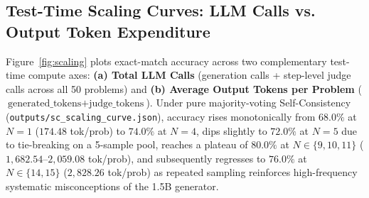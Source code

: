 \documentclass[10pt,a4paper]{article}
\begin{document}
\begin{table}[h!]
\centering
\caption{Empirical benchmark results across all 50 GSM8K test problems (\texttt{outputs/results\_summary.json} and \texttt{outputs/bonus\_product\_logprob.json}). Across 250 shared candidate paths, the 7B judge evaluated $1{,}042$ parsed reasoning steps ($\bar{K} = 4.168$ steps/candidate). 95\% Confidence Intervals (CI) are computed via 1,000 bootstrap resamples (seed 5326).}
\label{tab:summary}
\end{table}

\subsection{Test-Time Scaling Curves: LLM Calls vs. Output Token Expenditure}
Figure~\ref{fig:scaling} plots exact-match accuracy across two complementary test-time compute axes: \textbf{(a) Total LLM Calls} (generation calls + step-level judge calls across all 50 problems) and \textbf{(b) Average Output Tokens per Problem} ($\text{generated\_tokens} + \text{judge\_tokens}$). Under pure majority-voting Self-Consistency (\texttt{outputs/sc\_scaling\_curve.json}), accuracy rises monotonically from $68.0\%$ at $N=1$ ($174.48$ tok/prob) to $74.0\%$ at $N=4$, dips slightly to $72.0\%$ at $N=5$ due to tie-breaking on a 5-sample pool, reaches a plateau of $80.0\%$ at $N \in \{9, 10, 11\}$ ($1{,}682.54$--$2{,}059.08$ tok/prob), and subsequently regresses to $76.0\%$ at $N \in \{14, 15\}$ ($2{,}828.26$ tok/prob) as repeated sampling reinforces high-frequency systematic misconceptions of the 1.5B generator.
\end{document}
